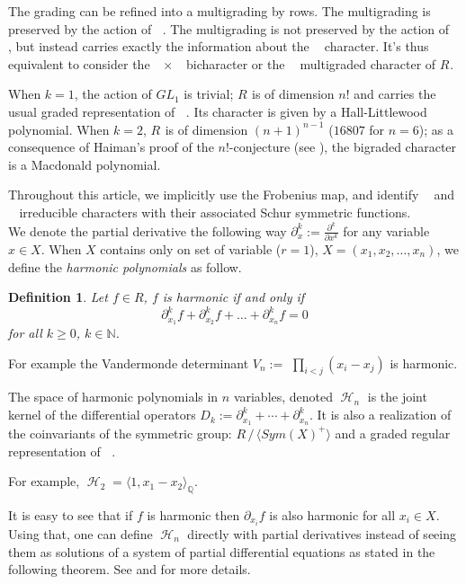 \documentclass[letter,12pt]{article}
\newcommand{\NN}{\mathbb{N}}
\newcommand{\QQ}{\mathbb{Q}}
\DeclareMathOperator{\Sn}{\mathbb{S}_n}
\DeclareMathOperator{\GLr}{GL_r}
\DeclareMathOperator{\harmonics}{\mathcal{H}}
\newtheorem{definition}{Definition}
\begin{document}
	The grading can be refined into a multigrading by rows. The multigrading is preserved by the action of $\Sn$. The multigrading is not preserved by the action of $\GLr$, but instead carries exactly the information about the $\GLr$ character. It's thus equivalent to consider the $\GLr \times \Sn$ bicharacter or the $\Sn$ multigraded character of $R_{\Sn}$.
	
	When $k=1$, the action of $GL_1$ is trivial; $R_{\Sn}$ is of dimension $n!$ and carries the usual graded representation of $\Sn$. Its character is given by a Hall-Littlewood polynomial.
	When $k=2$, $R_{\Sn}$ is of dimension $(n+1)^{n-1}$ ($16807$ for $n=6$); as a consequence of Haiman's proof of the $n!$-conjecture (see \cite{Haiman2002}), the bigraded character is a Macdonald polynomial.
	
	Throughout this article, we implicitly use the Frobenius map, and identify $\Sn$ and $\GLr$ irreducible characters with their associated Schur symmetric functions. \\
	
	We denote the partial derivative the following way $\partial^k_x := \frac{\partial^k}{\partial x^k}$ for any variable $x \in X$.
	When $X$ contains only on set of variable ($r=1$), $X = (x_1, x_2, \dots, x_n)$, we define the \emph{harmonic polynomials} as follow.
	
	\begin{definition}
		Let $f \in R$, $f$ is \emph{harmonic} if and only if
		$$\partial^k_{x_1} f + \partial^k_{x_2} f + \dots + \partial^k_{x_n} f = 0 $$
		for all $k \geq 0$, $k \in \NN$.
	\end{definition}

	For example the Vandermonde determinant $V_n:=$ $\prod_{i<j}(x_i-x_j)$ is harmonic. 

	The space of harmonic polynomials in $n$ variables, denoted $\harmonics_{n}$ is the joint kernel of the differential operators $D_k := \partial_{x_1}^k + \cdots + \partial_{x_n}^k$. It is also a realization of the coinvariants of the symmetric group: $R\, /\, \langle Sym(X)^+ \rangle$ and a graded regular representation of $\Sn$. 
	
	For example, $\harmonics_2 = \langle 1, x_1-x_2 \rangle_\QQ$. 
	
	It is easy to see that if $f$ is harmonic then $\partial_{x_i} f$ is also harmonic for all $x_i \in X$. Using that, one can define $\harmonics_{n}$ directly with  partial derivatives instead of seeing them as solutions of a system of partial differential equations as stated in the following theorem. See \cite{Haiman2002} and \cite{Bergeron2009} for more details. 
	
\end{document}
